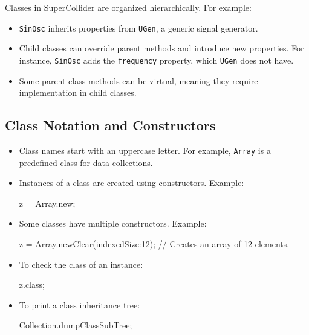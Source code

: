 Classes in SuperCollider are organized hierarchically. For example:

\begin{itemize}
    \item \texttt{SinOsc} inherits properties from \texttt{UGen}, a generic signal generator.
    \item Child classes can override parent methods and introduce new properties. For instance, \texttt{SinOsc} adds the \texttt{frequency} property, which \texttt{UGen} does not have.
    \item Some parent class methods can be virtual, meaning they require implementation in child classes.
\end{itemize}

\subsection{Class Notation and Constructors}

\begin{itemize}
    \item Class names start with an uppercase letter. For example, \texttt{Array} is a predefined class for data collections.
    \item Instances of a class are created using constructors. Example:
    
    \begin{supercollider*}
    z = Array.new;
    \end{supercollider*}
    
    \item Some classes have multiple constructors. Example:
    
    \begin{supercollider*}
    z = Array.newClear(indexedSize:12); // Creates an array of 12 elements.
    \end{supercollider*}
    
    \item To check the class of an instance:
    
    \begin{supercollider*}
    z.class;
    \end{supercollider*}
    
    \item To print a class inheritance tree:
    
    \begin{supercollider*}
    Collection.dumpClassSubTree;
    \end{supercollider*}
\end{itemize}

